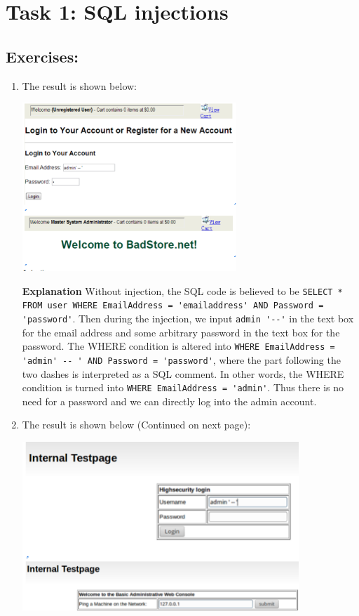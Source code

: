 \section*{Task 1: SQL injections}

\subsection*{Exercises:}
\begin{enumerate}
\item The result is shown below:
  \begin{center}\includegraphics[height=2.5in]{sqli1}
  \end{center}
  \textbf{Explanation} Without injection, the SQL code is believed to be \lstinline{SELECT * FROM user WHERE EmailAddress = 'emailaddress' AND Password = 'password'}. Then during the injection, we input \lstinline{admin '--'} in the text box for the email address and some arbitrary password in the text box for the password. The WHERE condition is altered into \lstinline{WHERE EmailAddress = 'admin' -- ' AND Password = 'password'}, where the part following the two dashes is interpreted as a SQL comment. In other words, the WHERE condition is turned into \lstinline{WHERE EmailAddress = 'admin'}. Thus there is no need for a password and we can directly log into the admin account.
\item The result is shown below (Continued on next page):
  \begin{center}\includegraphics[height=2.5in]{sqli2}

\end{center}
\end{enumerate}
